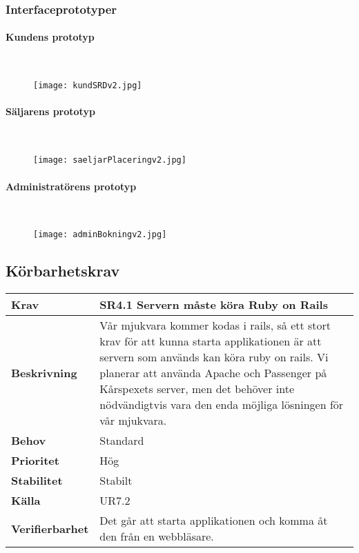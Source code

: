 \documentclass[a4paper, twoside, 11pt, titlepage]{article}
\begin{document}
		\subsubsection{Interfaceprototyper}



			\paragraph{Kundens prototyp}\

			\begin{figure}[ht] \centering \texttt{[image: kundSRDv2.jpg]} \end{figure} \FloatBarrier

			\paragraph{Säljarens prototyp}\

			\begin{figure}[ht] \centering \texttt{[image: saeljarPlaceringv2.jpg]} \end{figure} \FloatBarrier

			\paragraph{Administratörens prototyp}\

			\begin{figure}[ht] \centering \texttt{[image: adminBokningv2.jpg]} \end{figure} \FloatBarrier

	\subsection{Körbarhetskrav}


	\begin {table} [ht] \begin{tabular} { p{2.6cm} p{12.5cm} }
		\hline
		\sffamily\textbf{Krav} & \sffamily\textbf{SR4.1 Servern måste köra Ruby on Rails } \\
		\hline
		\sffamily\textbf{Beskrivning} & Vår mjukvara kommer kodas i rails, så ett stort krav för att kunna starta applikationen är att servern som används kan köra ruby on rails. Vi planerar att använda Apache och Passenger på Kårspexets server, men det behöver inte nödvändigtvis vara den enda möjliga lösningen för vår mjukvara.  \\
		\hline
		\sffamily\textbf{Behov} & Standard  \\
		\hline
		\sffamily\textbf{Prioritet} & Hög  \\
		\hline
		\sffamily\textbf{Stabilitet} & Stabilt  \\
		\hline
		\sffamily\textbf{Källa} & UR7.2  \\
		\hline
		\sffamily\textbf{Verifierbarhet} & Det går att starta applikationen och komma åt den från en webbläsare.  \\
		\hline
	\end{tabular} \end{table} \FloatBarrier
	\vspace{6mm}
\end{document}
